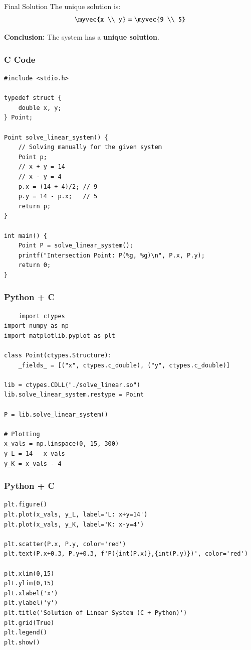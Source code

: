 \documentclass{beamer}
\begin{document}
\begin{frame}{Final Solution}
The unique solution is:
\begin{align}
\myvec{x \\ y} = \myvec{9 \\ 5}
\end{align}

\textbf{Conclusion:} 
The system has a \textbf{unique solution}.
\end{frame}

\begin{frame}[fragile]
    \frametitle{C Code}
    \begin{lstlisting}
#include <stdio.h>

typedef struct {
    double x, y;
} Point;

Point solve_linear_system() {
    // Solving manually for the given system
    Point p;
    // x + y = 14
    // x - y = 4
    p.x = (14 + 4)/2; // 9
    p.y = 14 - p.x;   // 5
    return p;
}

int main() {
    Point P = solve_linear_system();
    printf("Intersection Point: P(%g, %g)\n", P.x, P.y);
    return 0;
}
    \end{lstlisting}
\end{frame}

\begin{frame}[fragile]
    \frametitle{Python + C}
    \begin{lstlisting}
    import ctypes
import numpy as np
import matplotlib.pyplot as plt

class Point(ctypes.Structure):
    _fields_ = [("x", ctypes.c_double), ("y", ctypes.c_double)]

lib = ctypes.CDLL("./solve_linear.so")
lib.solve_linear_system.restype = Point

P = lib.solve_linear_system()

# Plotting
x_vals = np.linspace(0, 15, 300)
y_L = 14 - x_vals
y_K = x_vals - 4
    \end{lstlisting}
\end{frame}

\begin{frame}[fragile]
    \frametitle{Python + C}
    \begin{lstlisting}
plt.figure()
plt.plot(x_vals, y_L, label='L: x+y=14')
plt.plot(x_vals, y_K, label='K: x-y=4')

plt.scatter(P.x, P.y, color='red')
plt.text(P.x+0.3, P.y+0.3, f'P({int(P.x)},{int(P.y)})', color='red')

plt.xlim(0,15)
plt.ylim(0,15)
plt.xlabel('x')
plt.ylabel('y')
plt.title('Solution of Linear System (C + Python)')
plt.grid(True)
plt.legend()
plt.show()
    \end{lstlisting}
\end{frame}
\end{document}
